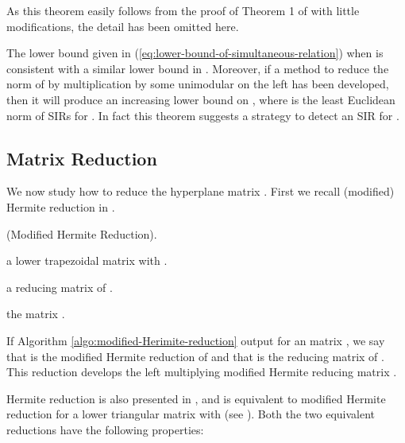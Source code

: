 \documentclass{sig-alternate}
\numberwithin{theorem}{section} \numberwithin{equation}{section}
\begin{document}
As this theorem easily follows from the proof of Theorem 1 of \cite{FBA1999} with
little modifications, the detail has been  omitted here.

 The lower
bound given in (\ref{eq:lower-bound-of-simultaneous-relation}) when
 is consistent with a similar lower bound in \cite{FF1979,
FF1982}. Moreover, if a method to reduce the norm of  by
multiplication by some unimodular  on the
left has been developed, then it will produce an increasing lower
bound on , where  is the least Euclidean
norm of SIRs for . In fact this theorem suggests a strategy to
detect an SIR for .



\subsection{Matrix Reduction}\label{subsec:Matrix-Reudce}
We now study how to reduce the hyperplane matrix . First we recall (modified) Hermite reduction in \cite{FBA1999}.



\begin{algorithm}[H]
\caption{(Modified Hermite Reduction).}
\begin{algorithmic}[1]
\REQUIRE a lower trapezoidal matrix  with .

\ENSURE a reducing matrix  of .

\STATE {}





\STATE {\ \ \ \ \ \ \ \ \ \ \ \ }



\RETURN the  matrix .

\end{algorithmic}\label{algo:modified-Herimite-reduction}
\end{algorithm}

If Algorithm \ref{algo:modified-Herimite-reduction} output  for
an  matrix ,  we say that  is the modified
Hermite reduction of  and that  is the reducing matrix of .
This reduction develops the left multiplying modified Hermite
reducing matrix .


Hermite reduction is also presented in \cite{FBA1999}, and is
equivalent to modified Hermite reduction  for a lower triangular
matrix  with  (see \cite[Lemma 3]{FBA1999}). Both
the two equivalent reductions have the following properties:
\end{document}
